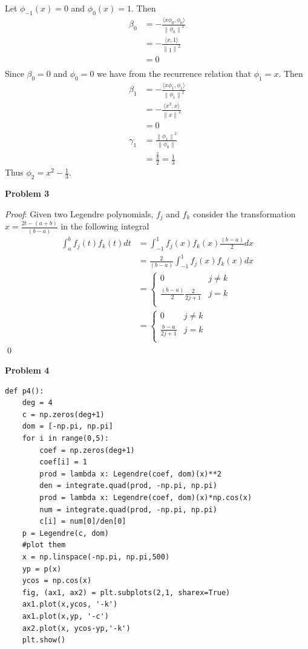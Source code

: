 \documentclass[12pt]{article}
\newcommand{\problem}[1]{\hspace{-4 ex} \large \textbf{Problem #1} }
\newcommand{\norm}[1]{\left\lVert#1\right\rVert}
\renewenvironment{proof}{\hspace{-4 ex} \emph{Proof}:}{\qed}
\begin{document}
	Let $\phi_{-1}(x) = 0$ and $\phi_0(x) = 1$. Then 
	\begin{align*}
		\beta_0 & = - \frac{\langle x \phi_0, \phi_0 \rangle}{\norm{\phi_0}^2} \\
		& = - \frac{\langle x, 1 \rangle}{\norm{1}^2} \\
		& = 0 \\
	\end{align*}
	Since $\beta_0 = 0$ and $\phi_0 = 0$ we have from the recurrence relation that $\phi_1 = x$. Then
	\begin{align*}
	\beta_1 & = - \frac{\langle x \phi_1, \phi_1 \rangle}{\norm{\phi_1}^2} \\
		& = - \frac{\langle x^2, x \rangle}{\norm{x}^2} \\
		& = 0 \\
		\gamma_1 & = \frac{\norm{\phi_1}^2}{ \norm{\phi_{0}}} \\
		& = \frac{\tfrac{2}{3}}{2} = \tfrac{1}{3}
	\end{align*}
	Thus $\phi_2 = x^2 - \tfrac{1}{3}$.
	
\problem{3} 

	\begin{proof}
		Given two Legendre polynomials, $f_j$ and $f_k$ consider the transformation $x=\frac{2t-(a+b)}{(b-a)}$ in the following integral
		\begin{align*}
			\int_a^b f_j(t)f_k(t) dt & = \int_{-1}^1f_j(x)f_k(x) \frac{(b-a)}{2} dx \\
			& = \frac{2}{(b-a)} \int_{-1}^1f_j(x)f_k(x) dx \\
			& = 
				\begin{cases} 
					0 & j \neq k\\
					\frac{(b-a)}{2} \frac{2}{2j+1} & j=k \\
				\end{cases}\\
			& = 
				\begin{cases} 
					0 & j \neq k\\
					\frac{b-a}{2j+1} & j=k \\
				\end{cases}
		\end{align*}
	\end{proof}

\problem{4} 

	\begin{lstlisting}
def p4():
	deg = 4
	c = np.zeros(deg+1)
	dom = [-np.pi, np.pi]
	for i in range(0,5):
		coef = np.zeros(deg+1)
		coef[i] = 1
		prod = lambda x: Legendre(coef, dom)(x)**2
		den = integrate.quad(prod, -np.pi, np.pi)
		prod = lambda x: Legendre(coef, dom)(x)*np.cos(x)
		num = integrate.quad(prod, -np.pi, np.pi)
		c[i] = num[0]/den[0]
	p = Legendre(c, dom)
	#plot them
	x = np.linspace(-np.pi, np.pi,500)
	yp = p(x)
	ycos = np.cos(x)
	fig, (ax1, ax2) = plt.subplots(2,1, sharex=True)
	ax1.plot(x,ycos, '-k')
	ax1.plot(x,yp, '-c')
	ax2.plot(x, ycos-yp,'-k')
	plt.show()
	\end{lstlisting}
	
\end{document}

